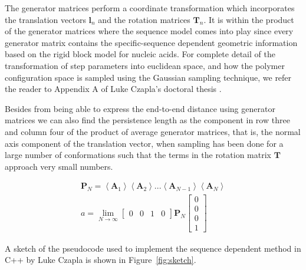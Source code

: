 The  generator  matrices  perform  a coordinate  transformation  which
incorporates the translation vectors $\mathbf{l}_{n}$ and the rotation
matrices $\mathbf{T}_{n}$.  It is within the product  of the generator
matrices  where  the  sequence  model  comes  into  play  since  every
generator  matrix contains  the specific-sequence  dependent geometric
information based  on the  rigid block model  for nucleic  acids.  For
complete  detail  of  the   transformation  of  step  parameters  into
euclidean  space, and how  the polymer  configuration space  is sampled
using the Gaussian sampling technique,  we refer the reader to Appendix
A of Luke Czapla's doctoral thesis \cite{czapla2009}.

Besides from being able to express the end-to-end distance using
generator matrices we can also find the persistence length as the
component in row three and column four of the product of average
generator matrices, that is, the normal axis component of the
translation vector, when sampling has been done for a large number of
conformations such that the terms in the rotation matrix
$\mathbf{T}$ approach very small numbers.

\begin{gather}
\mathbf{P}_{N} = \left<\mathbf{A}_{1}\right> \left<\mathbf{A}_{2}\right> ... \left<
\mathbf{A}_{N-1}\right> \left< \mathbf{A}_{N}\right>\\
a = \lim_{N \to \infty} \left[\begin{array}{cccc}0 & 0 & 1 & 0\end{array}
    \right] \mathbf{P}_{N}
\left[\begin{array}{c} 0\\ 0\\ 0\\ 1\end{array}\right]
\end{gather}  

A sketch of the pseudocode used to implement the sequence dependent
method in C++ by Luke Czapla is shown in Figure~\ref{fig:sketch}.

